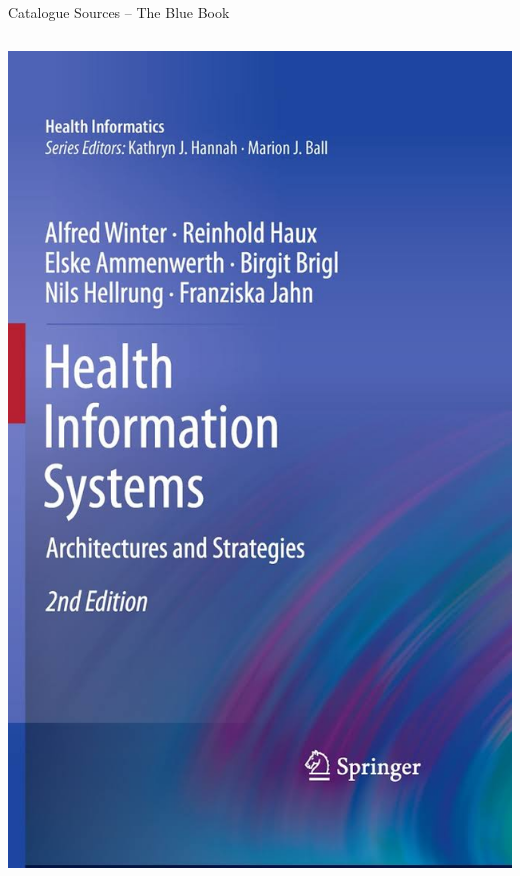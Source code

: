 \documentclass[aspectratio=1610,12pt]{beamer}
\newcommand{\enquote}[1]{{\glqq#1\grqq{}}}
\begin{document}
\begin{frame}{Catalogue Sources -- The \enquote{Blue Book}}
\begin{columns}
  \vspace{0.5cm}
  \centering
  \includegraphics[height=.8\textheight]{img/bb-cover.jpg}
  \vspace{0.5cm}
  \centering

\end{columns}
\end{frame}
\end{document}
